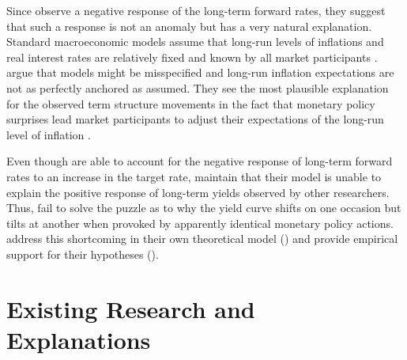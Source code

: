 \documentclass[11pt,a4paper,english,oneside]{book}
\numberwithin{equation}{chapter}
\begin{document}
Since \citeauthor{Gurkaynak.2005} observe a negative response of the long-term forward rates, they suggest that such a response is not an anomaly but has a very natural explanation. 
Standard macroeconomic models assume that long-run levels of inflations and real interest rates are relatively fixed and known by all market participants \citep[p. 425]{Gurkaynak.2005}. \citeauthor{Gurkaynak.2005} argue that models might be misspecified and long-run inflation expectations are not as perfectly anchored as assumed. They see the most plausible explanation for the observed term structure movements in the fact that monetary policy surprises lead market participants to adjust their expectations of the long-run level of inflation \citep[p. 434--435]{Gurkaynak.2005}.

Even though \cite{Gurkaynak.2005} are able to account for the negative response of long-term forward rates to an increase in the target rate, \citet[p. 2]{Ellingsen.2004} maintain that their model is unable to explain the positive response of long-term yields observed by other researchers. Thus, \cite{Gurkaynak.2005} fail to solve the puzzle as to why the yield curve shifts on one occasion but tilts at another when provoked by apparently identical monetary policy actions. \citeauthor{Ellingsen.2003} address this shortcoming in their own theoretical model (\citeyear{Ellingsen.2001}) and provide empirical support for their hypotheses (\citeyear{Ellingsen.2003}). 


\section{Existing Research and Explanations} \label{ExistingResearch}
\end{document}
